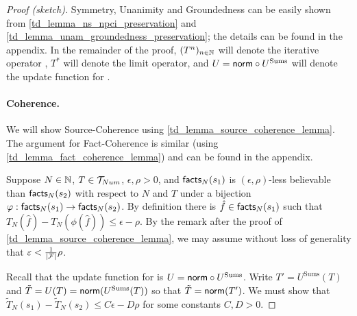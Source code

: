 \begin{proof}[Proof (sketch)]

Symmetry, Unanimity and Groundedness can be easily shown from
\cref{td_lemma_ns_npci_preservation} and
\cref{td_lemma_unam_groundedness_preservation}; the details can be found in the
appendix.
%
In the remainder of the proof, $(T^n)_{n \in \mathbb{N}}$ will denote the iterative
operator \sums{}, $T^*$ will denote the limit operator, and $U = \mathsf{norm} \circ
U^{\text{Sums}}$ will denote the update function for \sums{}.

\paragraph{Coherence.} We will show Source-Coherence using
\cref{td_lemma_source_coherence_lemma}. The argument for Fact-Coherence is similar
(using \cref{td_lemma_fact_coherence_lemma}) and can be found in the appendix.

Suppose $N \in \mathbb{N}$, $T \in \mathcal{T}_{Num}$, $\epsilon, \rho > 0$, and $\mathsf{facts}_N(s_1)$ is
$(\epsilon, \rho)$-less believable than $\mathsf{facts}_N(s_2)$ with respect to $N$ and
$T$ under a bijection $\varphi: \mathsf{facts}_N(s_1) \to \mathsf{facts}_N(s_2)$. By definition
there is $\hat{f} \in \mathsf{facts}_N(s_1)$ such that $T_N(\hat{f}) -
T_N(\phi(\hat{f})) \le \epsilon - \rho$. By the remark after the proof of
\cref{td_lemma_source_coherence_lemma}, we may assume without loss of generality
that $\varepsilon < \frac{1}{|\mathcal{F}|} \rho$.

Recall that the update function for \sums{} is $U = \mathsf{norm} \circ
U^{\text{Sums}}$. Write $T' = U^{\text{Sums}}(T)$ and $\tilde{T} = U(T)
= \mathsf{norm}(U^{\text{Sums}}(T))$ so that $\tilde{T} = \mathsf{norm}(T')$. We must show that
$\tilde{T}_N(s_1) - \tilde{T}_N(s_2) \le C\epsilon - D\rho$ for some constants
$C, D > 0$.


\end{proof}
